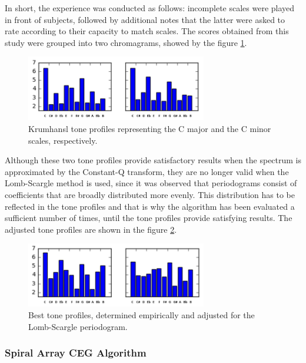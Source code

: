 \documentclass[letterpaper]{article}
\begin{document}
In short, the experience was conducted as follows: incomplete scales were played in front of subjects, followed by additional notes that the latter were asked to rate according to their capacity to match scales. The scores obtained from this study were grouped into two chromagrams, showed by the figure \ref{krumhansl}. \\

\begin{figure}
\begin{center}
\includegraphics[width=3.1in,angle=0]{imgs/Krumhansl.png}
\caption{Krumhansl tone profiles representing the C major and the C minor scales, respectively.}
\label{krumhansl}
\end{center}
\end{figure}

Although these two tone profiles provide satisfactory results when the spectrum is approximated by the Constant-Q transform, they are no longer valid 
when the Lomb-Scargle method is used, since it was observed that periodograms consist of coefficients that are broadly distributed more evenly. This distribution has to be reflected in the tone profiles and that is why the algorithm has been evaluated a sufficient number of times, until the tone profiles
provide satisfying results. The adjusted tone profiles are shown in the figure \ref{profiles}.

\begin{figure}
\begin{center}
\includegraphics[width=3.1in,angle=0]{imgs/Custom.png}
\caption{Best tone profiles, determined empirically and adjusted for the Lomb-Scargle periodogram.}
\label{profiles}
\end{center}
\end{figure}

\subsubsection{Spiral Array CEG Algorithm}
\end{document}
